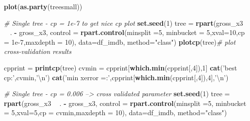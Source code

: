 \documentclass[
]{article}
\newenvironment{Shaded}{\begin{snugshade}}{\end{snugshade}}
\newcommand{\CharTok}[1]{\textcolor[rgb]{0.31,0.60,0.02}{#1}}
\newcommand{\CommentTok}[1]{\textcolor[rgb]{0.56,0.35,0.01}{\textit{#1}}}
\newcommand{\DataTypeTok}[1]{\textcolor[rgb]{0.13,0.29,0.53}{#1}}
\newcommand{\DecValTok}[1]{\textcolor[rgb]{0.00,0.00,0.81}{#1}}
\newcommand{\FloatTok}[1]{\textcolor[rgb]{0.00,0.00,0.81}{#1}}
\newcommand{\KeywordTok}[1]{\textcolor[rgb]{0.13,0.29,0.53}{\textbf{#1}}}
\newcommand{\NormalTok}[1]{#1}
\newcommand{\OperatorTok}[1]{\textcolor[rgb]{0.81,0.36,0.00}{\textbf{#1}}}
\newcommand{\StringTok}[1]{\textcolor[rgb]{0.31,0.60,0.02}{#1}}
\begin{document}
\begin{Shaded}
\begin{Highlighting}[]
{\KeywordTok{plot}\NormalTok{(}\KeywordTok{as.party}\NormalTok{(treesmall))}


\CommentTok{# Single tree - cp = 1e-7 to get nice cp plot}
\KeywordTok{set.seed}\NormalTok{(}\DecValTok{1}\NormalTok{)}
\NormalTok{tree =}\StringTok{ }\KeywordTok{rpart}\NormalTok{(gross_x3 }\OperatorTok{~}\StringTok{ }\NormalTok{. }\OperatorTok{-}\StringTok{ }\NormalTok{gross_x3, }
             \DataTypeTok{control =} \KeywordTok{rpart.control}\NormalTok{(}\DataTypeTok{minsplit =}\DecValTok{5}\NormalTok{, }\DataTypeTok{minbucket =} \DecValTok{5}\NormalTok{,}\DataTypeTok{xval=}\DecValTok{10}\NormalTok{,}\DataTypeTok{cp =} \FloatTok{1e-7}\NormalTok{,}\DataTypeTok{maxdepth =} \DecValTok{10}\NormalTok{), }
             \DataTypeTok{data=}\NormalTok{df_imdb, }\DataTypeTok{method=}\StringTok{"class"}\NormalTok{)}
\KeywordTok{plotcp}\NormalTok{(tree)}\CommentTok{#   plot cross-validation results}

\NormalTok{cpprint =}\StringTok{ }\KeywordTok{printcp}\NormalTok{(tree)}
\NormalTok{cvmin =}\StringTok{ }\NormalTok{cpprint[}\KeywordTok{which.min}\NormalTok{(cpprint[,}\DecValTok{4}\NormalTok{]),}\DecValTok{1}\NormalTok{]}
\KeywordTok{cat}\NormalTok{(}\StringTok{'best cp:'}\NormalTok{,cvmin,}\StringTok{'}\CharTok{\textbackslash{}n}\StringTok{'}\NormalTok{)}
\KeywordTok{cat}\NormalTok{(}\StringTok{'min xerror =:'}\NormalTok{,cpprint[}\KeywordTok{which.min}\NormalTok{(cpprint[,}\DecValTok{4}\NormalTok{]),}\DecValTok{4}\NormalTok{],}\StringTok{'}\CharTok{\textbackslash{}n}\StringTok{'}\NormalTok{)}


\CommentTok{# Single tree - cp = 0.006 --> cross validated parameter}
\KeywordTok{set.seed}\NormalTok{(}\DecValTok{1}\NormalTok{)}
\NormalTok{tree =}\StringTok{ }\KeywordTok{rpart}\NormalTok{(gross_x3 }\OperatorTok{~}\StringTok{ }\NormalTok{. }\OperatorTok{-}\StringTok{ }\NormalTok{gross_x3, }
             \DataTypeTok{control =} \KeywordTok{rpart.control}\NormalTok{(}\DataTypeTok{minsplit =}\DecValTok{5}\NormalTok{, }\DataTypeTok{minbucket =} \DecValTok{5}\NormalTok{,}\DataTypeTok{xval=}\DecValTok{5}\NormalTok{,}\DataTypeTok{cp =}\NormalTok{ cvmin,}\DataTypeTok{maxdepth =} \DecValTok{10}\NormalTok{), }
             \DataTypeTok{data=}\NormalTok{df_imdb, }\DataTypeTok{method=}\StringTok{"class"}\NormalTok{)}

}
\end{Highlighting}
\end{Shaded}
\end{document}

